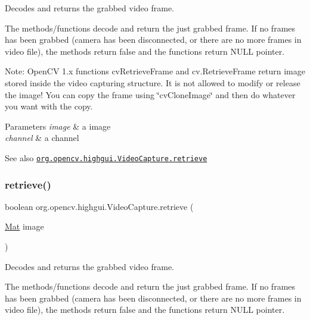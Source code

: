 Decodes and returns the grabbed video frame.

The methods/functions decode and return the just grabbed frame. If no frames has been grabbed (camera has been disconnected, or there are no more frames in video file), the methods return false and the functions return N\+U\+LL pointer.

Note\+: Open\+CV 1.\+x functions {\ttfamily cv\+Retrieve\+Frame} and {\ttfamily cv.\+Retrieve\+Frame} return image stored inside the video capturing structure. It is not allowed to modify or release the image! You can copy the frame using \char`\"{}cv\+Clone\+Image\char`\"{} and then do whatever you want with the copy.


\begin{DoxyParams}{Parameters}
{\em image} & a image \\
\hline
{\em channel} & a channel\\
\hline
\end{DoxyParams}
\begin{DoxySeeAlso}{See also}
\href{http://docs.opencv.org/modules/highgui/doc/reading_and_writing_images_and_video.html#videocapture-retrieve}{\tt org.\+opencv.\+highgui.\+Video\+Capture.\+retrieve} 
\end{DoxySeeAlso}
\mbox{\label{classorg_1_1opencv_1_1highgui_1_1_video_capture_a5b76f1b3ed4a3c37249c3e06af9bbeba}} 
\subsubsection{\texorpdfstring{retrieve()}{retrieve()}\hspace{0.1cm}{\footnotesize\ttfamily [2/2]}}
{\footnotesize\ttfamily boolean org.\+opencv.\+highgui.\+Video\+Capture.\+retrieve (\begin{DoxyParamCaption}\item[{\mbox{\hyperlink{classorg_1_1opencv_1_1core_1_1_mat}{Mat}}}]{image }\end{DoxyParamCaption})}

Decodes and returns the grabbed video frame.

The methods/functions decode and return the just grabbed frame. If no frames has been grabbed (camera has been disconnected, or there are no more frames in video file), the methods return false and the functions return N\+U\+LL pointer.

